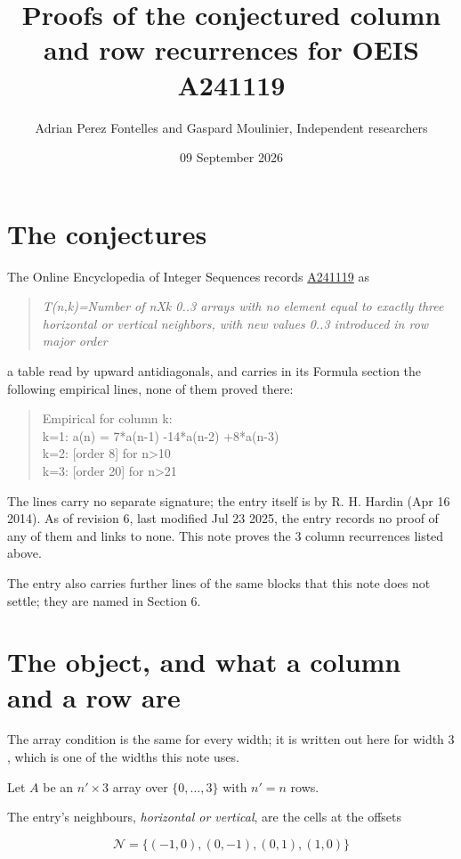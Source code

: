 \documentclass[11pt]{article}
\title{Proofs of the conjectured column and row recurrences for OEIS A241119}
\author{Adrian Perez Fontelles and Gaspard Moulinier, Independent researchers}
\date{09 September 2026}
\theoremstyle{definition}
\begin{document}
\maketitle
\section{The conjectures}

The Online Encyclopedia of Integer Sequences records \href{https://oeis.org/A241119}{A241119} as

\begin{quote}\itshape T(n,k)=Number of nXk 0..3 arrays with no element equal to exactly three horizontal or vertical neighbors, with new values 0..3 introduced in row major order\end{quote}

a table read by upward antidiagonals, and carries in its Formula section the following empirical lines, none of them proved there:

\begin{quote}\ttfamily Empirical for column k:\\
k=1: a(n) = 7*a(n-1) -14*a(n-2) +8*a(n-3)\\k=2: [order 8] for n>10\\k=3: [order 20] for n>21\end{quote}

The lines carry no separate signature; the entry itself is by R. H. Hardin (Apr 16 2014). As of revision 6, last modified Jul 23 2025, the entry records no proof of any of them and links to none. This note proves the 3 column recurrences listed above.

The entry also carries further lines of the same blocks that this note does not settle; they are named in Section 6.

\section{The object, and what a column and a row are}

The array condition is the same for every width; it is written out here for width $3$, which is one of the widths this note uses.

Let $A$ be an $n' \times 3$ array over $\{0,\dots,3\}$ with $n' = n$ rows.

The entry's neighbours, {\itshape horizontal or vertical}, are the cells at the offsets

\[\mathcal{N} = \{(-1,0), (0,-1), (0,1), (1,0)\}\]
\end{document}
